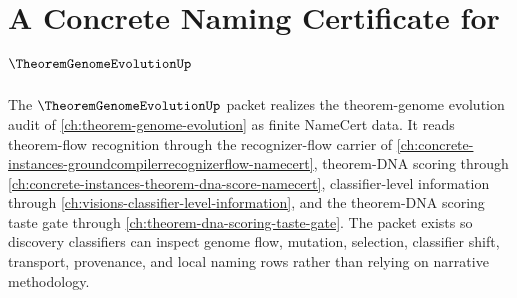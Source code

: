 \chapter{A Concrete Naming Certificate for $\TheoremGenomeEvolutionUp$}
\label{ch:concrete-instances-theorem-genome-evolution-namecert}

The $\TheoremGenomeEvolutionUp$ packet realizes the theorem-genome evolution audit of \autoref{ch:theorem-genome-evolution} as finite NameCert data. It reads theorem-flow recognition through the recognizer-flow carrier of \autoref{ch:concrete-instances-groundcompilerrecognizerflow-namecert}, theorem-DNA scoring through \autoref{ch:concrete-instances-theorem-dna-score-namecert}, classifier-level information through \autoref{ch:visions-classifier-level-information}, and the theorem-DNA scoring taste gate through \autoref{ch:theorem-dna-scoring-taste-gate}. The packet exists so discovery classifiers can inspect genome flow, mutation, selection, classifier shift, transport, provenance, and local naming rows rather than relying on narrative methodology.

